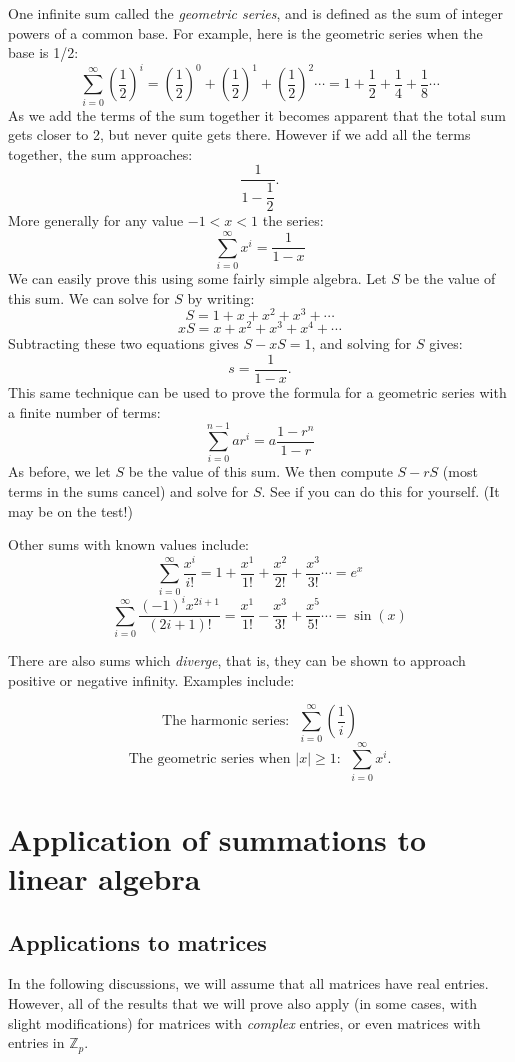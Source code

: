 One infinite sum called the \emph{geometric series}, and is defined as the sum of integer powers of a common base.  For example, here is the geometric series when the base is 1/2:
\[\sum_{i=0}^{\infty}({\dfrac{1}{2}})^i=({\dfrac{1}{2}})^0+({\dfrac{1}{2}})^1+({\dfrac{1}{2}})^2\cdots = 1 + {\dfrac{1}{2}} + {\dfrac{1}{4}} + {\dfrac{1}{8}}\cdots\]
As we add the terms of the sum together it becomes apparent that the total sum gets closer to 2, but never quite gets there.  However if we add all the terms together, the sum approaches:
\[\dfrac{1}{1-\dfrac{1}{2}}.\]
More generally for any value $-1<x<1$ the series:
\[\sum_{i=0}^{\infty}x^i = \dfrac{1}{1-x}\]
We can easily prove this using some fairly simple algebra.  Let $S$ be the value of this sum.  We can solve for $S$  by writing:
 \[S=1+x+x^2+x^3+ \cdots \]
\[xS=x+x^2+x^3+x^4+ \cdots \] 
Subtracting these two equations gives $S-xS=1$, and solving for $S$ gives:
\[s=\dfrac{1}{1-x}. \]
This same technique can be used to prove the formula for a geometric series with a finite number of terms:
\[ \sum_{i=0}^{n-1} ar^i = a \dfrac{1-r^n}{1-r} \]
As before, we let $S$ be the value of this sum. We then compute $S - rS$ (most terms in the sums cancel) and solve for $S$.  See if you can do this for yourself.  (It may be on the test!)

Other sums with known values include:
\[\sum_{i=0}^{\infty}\dfrac{x^i}{i!} =1+\dfrac{x^1}{1!}+\dfrac{x^2}{2!}+\dfrac{x^3}{3!} \cdots=e^x\]
\[\sum_{i=0}^{\infty}\dfrac{(-1)^i x^{2i+1}}{(2i+1)!} = \dfrac{x^1}{1!}-\dfrac{x^3}{3!}+\dfrac{x^5}{5!}\cdots= \sin(x)\]

There are also sums which \emph{diverge}, that is, they can be shown to approach positive or negative infinity. Examples include:

\[\text{The harmonic series:~~}\sum_{i=0}^{\infty}\left(\dfrac{1}{i} \right) \]
\[\text{The geometric series when~} |x| \ge 1: ~~\sum_{i=0}^{\infty} x^i. \]

\section{Application of summations to linear algebra}

\subsection{Applications to matrices}

In the following discussions, we will assume that all matrices have real entries.  However, all of the results that we will prove also apply (in some cases, with slight modifications)  for matrices with \emph{complex} entries, or even matrices with entries in $\mathbb{Z}_p$.

